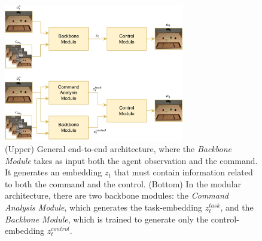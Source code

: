 \begin{figure}[th]
    \centering
    \includegraphics[width=0.7\textwidth]{figures/images/ch3/end_to_end_vs_modular.jpg}
    \caption{(Upper) General end-to-end architecture, where the \textit{Backbone Module} takes as input both the agent observation and the command. It generates an embedding $z_{t}$ that must contain information related to both the command and the control. (Bottom) In the modular architecture, there are two backbone modules: the \textit{Command Analysis Module}, which generates the task-embedding $z^{task}_t$, and the \textit{Backbone Module}, which is trained to generate only the control-embedding $z^{control}_{t}$.}
    \label{fig:end_to_end_vs_modular}
\end{figure}
